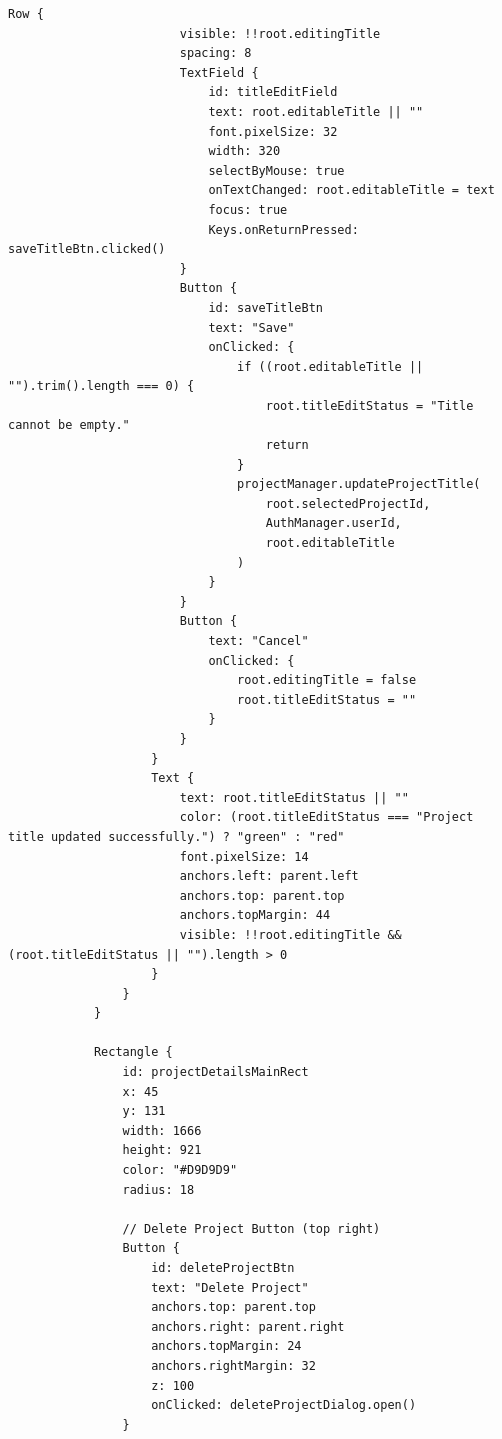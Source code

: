 \documentclass{report}
\begin{document}
\begin{lstlisting}[style=qmlstyle]
                    Row {
                        visible: !!root.editingTitle
                        spacing: 8
                        TextField {
                            id: titleEditField
                            text: root.editableTitle || ""
                            font.pixelSize: 32
                            width: 320
                            selectByMouse: true
                            onTextChanged: root.editableTitle = text
                            focus: true
                            Keys.onReturnPressed: saveTitleBtn.clicked()
                        }
                        Button {
                            id: saveTitleBtn
                            text: "Save"
                            onClicked: {
                                if ((root.editableTitle || "").trim().length === 0) {
                                    root.titleEditStatus = "Title cannot be empty."
                                    return
                                }
                                projectManager.updateProjectTitle(
                                    root.selectedProjectId,
                                    AuthManager.userId,
                                    root.editableTitle
                                )
                            }
                        }
                        Button {
                            text: "Cancel"
                            onClicked: {
                                root.editingTitle = false
                                root.titleEditStatus = ""
                            }
                        }
                    }
                    Text {
                        text: root.titleEditStatus || ""
                        color: (root.titleEditStatus === "Project title updated successfully.") ? "green" : "red"
                        font.pixelSize: 14
                        anchors.left: parent.left
                        anchors.top: parent.top
                        anchors.topMargin: 44
                        visible: !!root.editingTitle && (root.titleEditStatus || "").length > 0
                    }
                }
            }

            Rectangle {
                id: projectDetailsMainRect
                x: 45
                y: 131
                width: 1666
                height: 921
                color: "#D9D9D9"
                radius: 18

                // Delete Project Button (top right)
                Button {
                    id: deleteProjectBtn
                    text: "Delete Project"
                    anchors.top: parent.top
                    anchors.right: parent.right
                    anchors.topMargin: 24
                    anchors.rightMargin: 32
                    z: 100
                    onClicked: deleteProjectDialog.open()
                }


\end{lstlisting}
\end{document}

